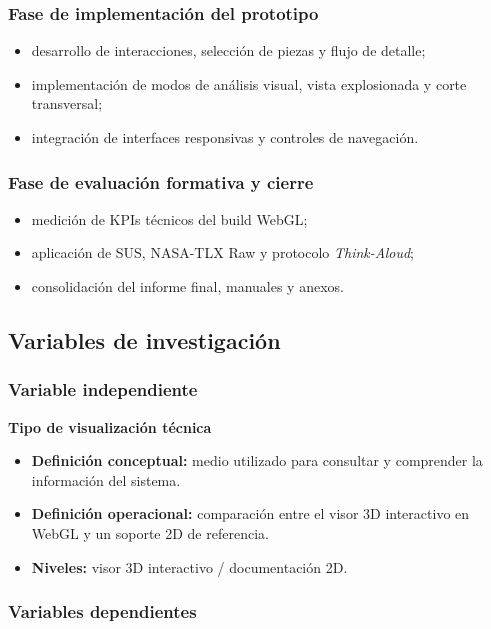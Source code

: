 \subsubsection{Fase de implementaci\'on del prototipo}
\begin{itemize}
    \item desarrollo de interacciones, selecci\'on de piezas y flujo de detalle;
    \item implementaci\'on de modos de an\'alisis visual, vista explosionada y corte transversal;
    \item integraci\'on de interfaces responsivas y controles de navegaci\'on.
\end{itemize}

\subsubsection{Fase de evaluaci\'on formativa y cierre}
\begin{itemize}
    \item medici\'on de KPIs t\'ecnicos del build WebGL;
    \item aplicaci\'on de SUS, NASA-TLX Raw y protocolo \textit{Think-Aloud};
    \item consolidaci\'on del informe final, manuales y anexos.
\end{itemize}

\subsection{Variables de investigaci\'on}

\subsubsection{Variable independiente}

\textbf{Tipo de visualizaci\'on t\'ecnica}
\begin{itemize}
    \item \textbf{Definici\'on conceptual:} medio utilizado para consultar y comprender la informaci\'on del sistema.
    \item \textbf{Definici\'on operacional:} comparaci\'on entre el visor 3D interactivo en WebGL y un soporte 2D de referencia.
    \item \textbf{Niveles:} visor 3D interactivo / documentaci\'on 2D.
\end{itemize}

\subsubsection{Variables dependientes}

